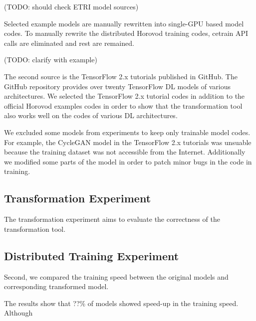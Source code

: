 (TODO: should check ETRI model sources)

Selected example models are manually rewritten into
single-GPU based model codes. To manually rewrite the distributed Horovod
training codes, cetrain API calls are eliminated and rest are remained.   

(TODO: clarify with example)

The second source is the TensorFlow 2.x tutorials published in
GitHub\cite{tf2tutogithub}. The GitHub repository provides over twenty
TensorFlow DL models of various architectures. 
We selected the TensorFlow 2.x tutorial codes in addition to the official
Horovod examples codes in order to show that the transformation tool
also works well on the codes of various DL architectures.

We excluded some models from experiments to keep only trainable model codes. 
For example, the CycleGAN model in the TensorFlow 2.x tutorials
was unsuable because the training dataset was not accessible from the
Internet. Additionally we modified some parts of the model in order to patch
minor bugs in the code in training.

\subsection{Transformation Experiment}

The transformation experiment aims to evaluate the correctness of the
transformation tool.   

\subsection{Distributed Training Experiment}

Second, we compared the training speed between the original models and
corresponding transformed model. 

The results show that ??\% of models showed speed-up in the training speed.
Although  
